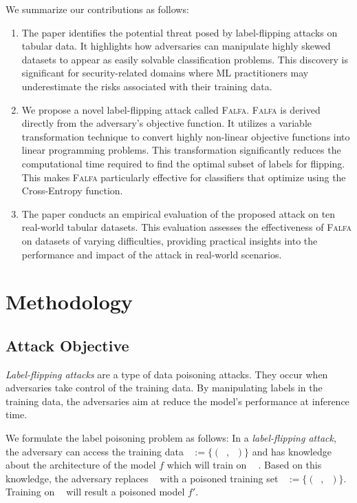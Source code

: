 \documentclass[runningheads]{llncs}
\newcommand{\falfa}{\textsc{Falfa}\xspace}
\DeclareMathOperator*{\Xtr}{\mathcal{X}_\text{train}}
\DeclareMathOperator*{\ytr}{\mathcal{Y}_\text{train}}
\DeclareMathOperator*{\Xpo}{\mathcal{X}^\prime_\text{train}}
\DeclareMathOperator*{\ypo}{\mathcal{Y}^\prime_\text{train}}
\DeclareMathOperator*{\Dpo}{\mathcal{D}^\prime_\text{train}}
\DeclareMathOperator*{\Dtr}{\mathcal{D}_\text{train}}
\begin{document}
We summarize our contributions as follows:
\begin{enumerate}
    \item The paper identifies the potential threat posed by label-flipping attacks on tabular data. It highlights how adversaries can manipulate highly skewed datasets to appear as easily solvable classification problems. This discovery is significant for security-related domains where ML practitioners may underestimate the risks associated with their training data.
    \item We propose a novel label-flipping attack called \falfa. \falfa is derived directly from the adversary's objective function. It utilizes a variable transformation technique to convert highly non-linear objective functions into linear programming problems. This transformation significantly reduces the computational time required to find the optimal subset of labels for flipping. This makes \falfa particularly effective for classifiers that optimize using the Cross-Entropy function.
    \item The paper conducts an empirical evaluation of the proposed attack on ten real-world tabular datasets. This evaluation assesses the effectiveness of \falfa on datasets of varying difficulties, providing practical insights into the performance and impact of the attack in real-world scenarios.
\end{enumerate}

\section{Methodology}
\label{sec:methodology}

\subsection{Attack Objective}
\label{sec:method:objective}

\emph{Label-flipping attacks} are a type of data poisoning attacks. 
They occur when adversaries take control of the training data.
By manipulating labels in the training data, the adversaries aim at reduce the model's performance at inference time.

We formulate the label poisoning problem as follows:
In a \emph{label-flipping attack}, the adversary can access the training data $\Dtr:=\{(\Xtr, \ytr)\}$ and has knowledge about the architecture of the model $f$ which will train on $\Dtr$ \cite{cina2022wild}. 
Based on this knowledge, the adversary replaces $\Dtr$ with a poisoned training set $\Dpo:=\{(\Xpo, \ypo)\}$.
Training on $\Dpo$ will result a poisoned model $f'$.
\end{document}
